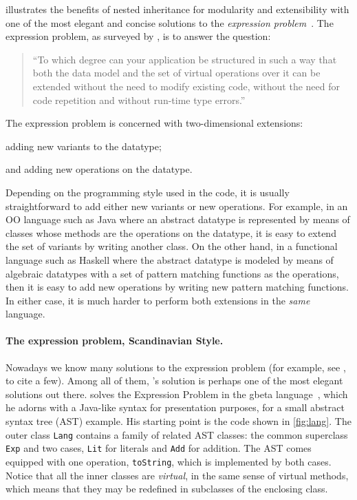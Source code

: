 \citet{ernst2004expression} illustrates the benefits of nested inheritance for modularity
and extensibility with one of the most elegant and concise solutions to the
\emph{expression problem}~\citep{wadler1998expression}. The expression problem,
as surveyed by \citet{togersen:2004}, is to answer the question:
\begin{quote}
  ``To which degree can your application be structured in such a way that both
  the data model and the set of virtual operations over it can be extended
  without the need to modify existing code, without the need for code repetition
  and without run-time type errors.''
\end{quote}
The expression problem is concerned with two-dimensional extensions:
\begin{inparaenum}[(1)]
\item adding new variants to the datatype;
\item and adding new operations on the datatype.
\end{inparaenum}
Depending on the programming style used in the code, it is usually
straightforward to add either new variants or new operations. For example, in an
OO language such as Java where an abstract datatype is represented by means of
classes whose methods are the operations on the datatype, it is easy to extend
the set of variants by writing another class. On the other hand, in a functional
language such as Haskell where the abstract datatype is modeled by means of
algebraic datatypes with a set of pattern matching functions as the operations,
then it is easy to add new operations by writing new pattern matching functions.
In either case, it is much harder to perform both extensions in the
\textit{same} language.


\paragraph{The expression problem, Scandinavian Style.}

Nowadays we know many solutions to the expression problem (for example, see
\citet{oliveira2012extensibility, wang2016expression, oliveira09modular,
  swierstra_2008, Zenger-Odersky2005}, to cite a few). Among all of them,
\citeauthor{ernst2004expression}'s solution is perhaps one of the most elegant
solutions out there. \citeauthor{ernst2004expression} solves the Expression
Problem in the \textsf{gbeta} language~\citep{ernst2000gbeta}, which he adorns with a Java-like syntax for
presentation purposes, for a small abstract syntax tree (AST) example. His
starting point is the code shown in \cref{fig:lang}. The outer class
\lstinline{Lang} contains a family of related AST classes: the common superclass
\lstinline{Exp} and two cases, \lstinline{Lit} for literals and \lstinline{Add}
for addition. The AST comes equipped with one operation, \lstinline{toString},
which is implemented by both cases. Notice that all the inner classes are
\textit{virtual}, in the same sense of virtual methods, which means that they
may be redefined in subclasses of the enclosing class.



